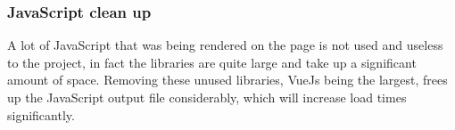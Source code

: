 \subsubsection{JavaScript clean up}
A lot of JavaScript that was being rendered on the page is not used and useless to the project, in fact the libraries are quite large and take up a significant amount of space. Removing these unused libraries, VueJs being the largest, frees up the JavaScript output file considerably, which will increase load times significantly.
\newpage
